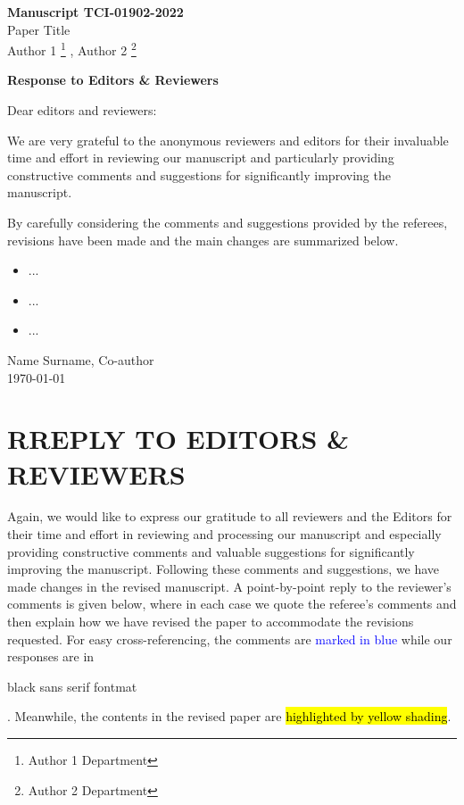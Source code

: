 \documentclass[12pt,review]{elsarticle}
\newcounter{reviewer}
\newcounter{point}[reviewer]
\def\myauthor{Author 1 \footnote{
	Author 1 Department
}
, Author 2 \footnote{
	Author 2 Department
}} %
\def\mycoauthor{Name Surname, Co-author}
\def\mytitle{Paper Title} %
\def\myarticleno{Manuscript TCI-01902-2022}
\def\mydate{\today} %
\begin{document}

\begin{titlepage}
\noindent \textbf{\myarticleno} \\
\mytitle \\
\myauthor
\begin{center}
  \vspace{1cm}

  \Large \textbf{Response to Editors \& Reviewers}

  \vspace{1cm}
\end{center}

\begin{tcolorbox}[title = To editors and reviewers]
	

Dear editors and reviewers:

\quad We are very grateful to the anonymous reviewers and editors for their invaluable time and effort in reviewing our manuscript and particularly providing constructive comments and suggestions for significantly improving the manuscript. 

\quad By carefully considering the comments and suggestions provided by the referees, revisions have been made and the main changes are summarized below.
\begin{itemize}
	\item ...
	\item ...
	\item ...
\end{itemize}
\mycoauthor \\
\mydate
\end{tcolorbox}

\end{titlepage}

\section*{RREPLY TO EDITORS \& REVIEWERS}
Again, we would like to express our gratitude to all reviewers and the Editors for their time and effort in reviewing and processing our manuscript and especially providing constructive comments and valuable suggestions for significantly improving the manuscript. Following these comments and suggestions, we have made changes in the revised manuscript. A point-by-point reply to the reviewer’s comments is given below, where in each case we quote the referee’s comments and then explain how we have revised the paper to accommodate the revisions requested. 
For easy cross-referencing, the comments are \textcolor{blue}{marked in blue} while our responses are in \begin{sf}black sans serif fontmat\end{sf}. Meanwhile, the contents in the revised paper are \hl{highlighted by yellow shading}.
\end{document}
